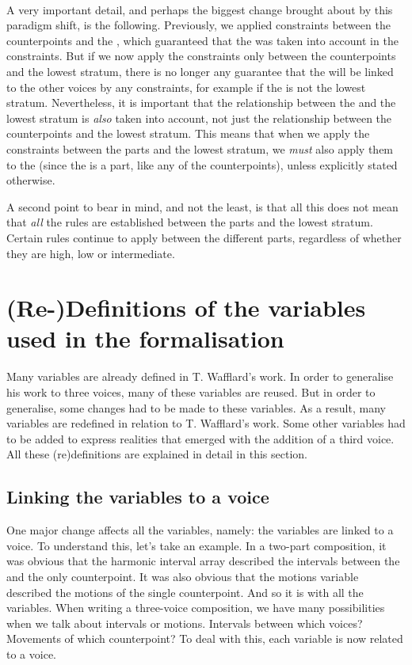 \paragraph{}
A very important detail, and perhaps the biggest change brought about by this paradigm shift, is the following. Previously, we applied constraints between the counterpoints and the \cf, which guaranteed that the \cfs was taken into account in the constraints. But if we now apply the constraints only between the counterpoints and the lowest stratum, there is no longer any guarantee that the \cfs will be linked to the other voices by any constraints, for example if the \cfs is not the lowest stratum. Nevertheless, it is important that the relationship between the \cfs and the lowest stratum is \textit{also} taken into account, not just the relationship between the counterpoints and the lowest stratum. This means that when we apply the constraints between the parts and the lowest stratum, we \textit{must} also apply them to the \cfs (since the \cfs is a part, like any of the counterpoints), unless explicitly stated otherwise. 

A second point to bear in mind, and not the least, is that all this does not mean that \textit{all} the rules are established between the parts and the lowest stratum. Certain rules continue to apply between the different parts, regardless of whether they are high, low or intermediate.

\section{(Re-)Definitions of the variables used in the formalisation} \label{section:changes induced}
Many variables are already defined in T. Wafflard's work. In order to generalise his work to three voices, many of these variables are reused. But in order to generalise, some changes had to be made to these variables. As a result, many variables are redefined in relation to T. Wafflard's work. Some other variables had to be added to express realities that emerged with the addition of a third voice. All these (re)definitions are explained in detail in this section.

\subsection{Linking the variables to a voice}
One major change affects all the variables, namely: the variables are linked to a voice. To understand this, let's take an example. In a two-part composition, it was obvious that the harmonic interval array described the intervals between the \cfs and the only counterpoint. It was also obvious that the motions variable described the motions of the single counterpoint. And so it is with all the variables. When writing a three-voice composition, we have many possibilities when we talk about intervals or motions. Intervals between which voices? Movements of which counterpoint? To deal with this, each variable is now related to a voice.

